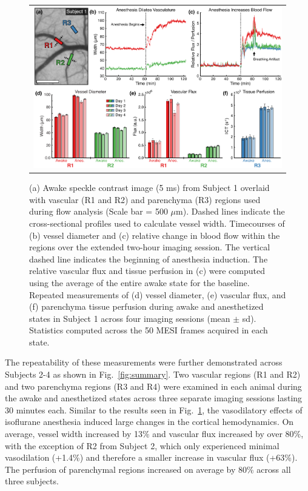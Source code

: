 \documentclass[12pt]{spieman}
\begin{document}
\begin{spacing}{2}
\begin{figure}
    \begin{center}
        \begin{tabular}{c}
            \includegraphics[width=6.25in]{Figure2.pdf}
        \end{tabular}
    \end{center}
    \caption {
        \label{fig:acute}
        (a) Awake speckle contrast image (5 ms) from Subject 1 overlaid with vascular (R1 and R2) and parenchyma (R3) regions used during flow analysis (Scale bar = 500 $\mu$m). Dashed lines indicate the cross-sectional profiles used to calculate vessel width. Timecourses of (b) vessel diameter and (c) relative change in blood flow within the regions over the extended two-hour imaging session. The vertical dashed line indicates the beginning of anesthesia induction. The relative vascular flux and tissue perfusion in (c) were computed using the average of the entire awake state for the baseline. Repeated measurements of (d) vessel diameter, (e) vascular flux, and (f) parenchyma tissue perfusion during awake and anesthetized states in Subject 1 across four imaging sessions (mean $\pm$ sd). Statistics computed across the 50 MESI frames acquired in each state.
    }
\end{figure}

The repeatability of these measurements were further demonstrated across Subjects 2-4 as shown in Fig.~\ref{fig:summary}. Two vascular regions (R1 and R2) and two parenchyma regions (R3 and R4) were examined in each animal during the awake and anesthetized states across three separate imaging sessions lasting 30 minutes each. Similar to the results seen in Fig.~\ref{fig:acute}, the vasodilatory effects of isoflurane anesthesia induced large changes in the cortical hemodynamics. On average, vessel width increased by 13\% and vascular flux increased by over 80\%, with the exception of R2 from Subject 2, which only experienced minimal vasodilation (+1.4\%) and therefore a smaller increase in vascular flux (+63\%). The perfusion of parenchymal regions increased on average by 80\% across all three subjects.


\end{spacing}
\end{document}
